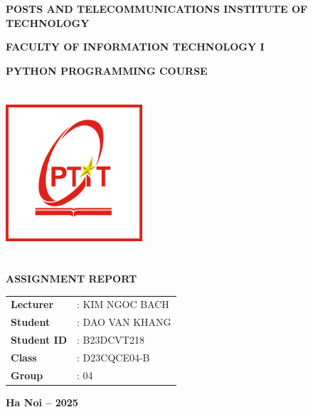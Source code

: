 \documentclass[12pt,a4paper]{report}
\begin{document}

\begin{titlepage}
   \begin{center}
      \textbf{\Large POSTS AND TELECOMMUNICATIONS INSTITUTE OF TECHNOLOGY}
   \end{center}
    
   \begin{center}
      \textbf{\Large FACULTY OF INFORMATION TECHNOLOGY I}
   \end{center}
    
   \begin{center}
      \textbf{\Large PYTHON PROGRAMMING COURSE}
   \end{center}
    
   \vspace{1cm}  %
   \begin{center}
      \includegraphics[width=2in, height=2.5in]{media/image7.png}
   \end{center}
    
   \vspace{1.5cm}  %
   \begin{center}
      \textbf{\LARGE ASSIGNMENT REPORT}
   \end{center}
    
   \vspace{1cm}  %
   \begin{center}
      \begin{tabular}{p{4cm} l}
          \textbf{Lecturer}     & : KIM NGOC BACH \\[0.3cm]  %
          \textbf{Student}      & : DAO VAN KHANG \\[0.3cm] 
          \textbf{Student ID}   & : B23DCVT218 \\[0.3cm]
          \textbf{Class}        & : D23CQCE04-B \\[0.3cm]
          \textbf{Group}        & : 04 \\[0.3cm]
      \end{tabular}
  \end{center}  

   \vfill  %
   \begin{center}
      \textbf{\large Ha Noi -- 2025}
   \end{center}
\end{titlepage}
\end{document}

